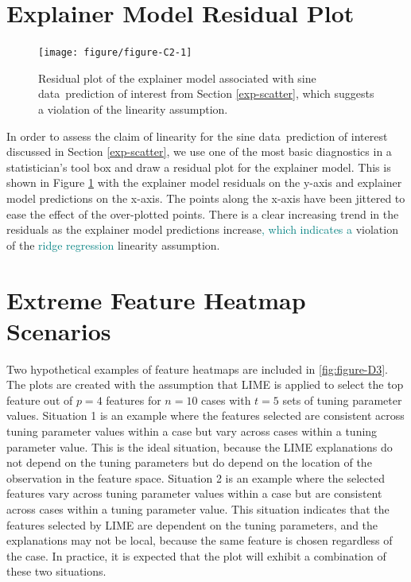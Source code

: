\documentclass[AMS,STIX2COL]{WileyNJD-v2}\usepackage[]{graphicx}\usepackage[]{color}
\newenvironment{knitrout}{}{} %
\newcommand{\kge}[1]{\textcolor{teal}{#1}}
\newcommand{\data}{sine data}
\renewcommand{\sout}[1]{\unskip}
\begin{document}
\section{Explainer Model Residual Plot} \label{residual-plot}
\begin{figure}[!b]
\begin{knitrout}
\color{fgcolor}

{\centering \texttt{[image: figure/figure-C2-1]} 

}



\end{knitrout}
\caption{Residual plot of the explainer model associated with \data \ prediction of interest from Section \ref{exp-scatter}\sout{. The residuals are plotted against the predicted values. The points are jittered in the x-direction to alleviate the over-plotting of points. There is\kge{a clear increase} \sout{an upward trend} in the residuals as the explainer model predictions increase}, which suggests a violation of the linearity assumption.}
\label{fig:figure-C2}
\end{figure}

In order to assess the claim of linearity for the \data \ prediction of interest discussed in Section \ref{exp-scatter}, we use one of the most basic diagnostics in a statistician's tool box and draw a residual plot for the explainer model. This is shown in Figure \ref{fig:figure-C2} with the explainer model residuals on the y-axis and explainer model predictions on the x-axis. The points along the x-axis have been jittered to ease the effect of the over-plotted points\sout{ in the visualization}. There is a clear increasing trend in the residuals as the explainer model predictions increase\kge{,}\sout{. This is a clear} \kge{which indicates a} violation of the \kge{ridge regression} linearity assumption\sout{ with the ridge regression model}.

\section{Extreme Feature Heatmap Scenarios} \label{feat-heat-ex}

Two hypothetical examples of feature heatmaps are included in \autoref{fig:figure-D3}. The plots are created with the assumption that LIME is applied to select the top feature out of $p=4$  features for $n=10$ cases with $t=5$ sets of tuning parameter values. Situation 1 is an example where the features selected are consistent across tuning parameter values within a case but vary across cases within a tuning parameter value. This is the ideal situation, because the LIME explanations do not depend on the tuning parameters but do depend on the location of the observation in the feature space. Situation 2 is an example where the selected features vary across tuning parameter values within a case but are consistent across cases within a tuning parameter value. This situation indicates that the features selected by LIME are dependent on the tuning parameters, and the explanations may not be  local, because the same feature is chosen regardless of the case. In practice, it is expected that the plot will exhibit a combination of these two situations.
\end{document}
